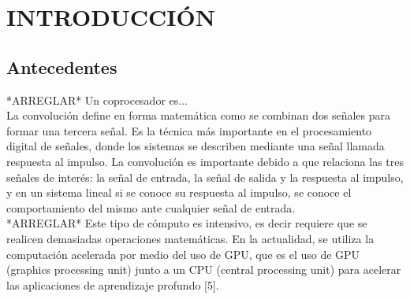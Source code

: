 \renewcommand\thechapter{\Roman{chapter}}
\chapter{INTRODUCCIÓN} \label{ch:intro} \thispagestyle{fancy} 
\renewcommand\thechapter{\arabic{chapter}}

\section{Antecedentes}
*ARREGLAR* 
Un coprocesador es... \\


La convolución define en forma matemática como se combinan dos señales para formar una tercera señal. Es la técnica más importante en el procesamiento digital de señales, donde los sistemas se describen mediante una señal llamada respuesta al impulso. La convolución es importante debido a que relaciona las tres señales de interés: la señal de entrada, la señal de salida y la respuesta al impulso, y en un sistema lineal si se conoce su respuesta al impulso, se conoce el comportamiento del mismo ante cualquier señal de entrada. \\

*ARREGLAR* Este tipo de cómputo es intensivo, es decir requiere que se realicen demasiadas operaciones matemáticas. En la actualidad, se utiliza la computación acelerada por medio del uso de GPU, que es el uso de GPU (graphics processing unit) junto a un CPU (central processing unit) para acelerar las aplicaciones de aprendizaje profundo [5].\\ 

